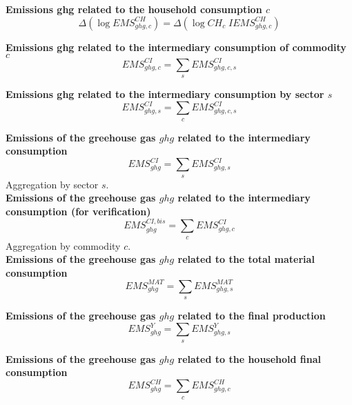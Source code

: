 \documentclass[12pt]{article}
\numberwithin{equation}{section}
\begin{document}
\noindent \textbf{Emissions ghg related to the household consumption $c$} 
\begin{dmath}
\varDelta \left(\operatorname{log} EMS^{CH}_{ghg, c}\right) = \varDelta \left(\operatorname{log} CH_{c} \; IEMS^{CH}_{ghg, c}\right)
\label{ghg_emissions.mdlEMS_CH[ghg,c]}
\end{dmath}

\noindent \textbf{Emissions ghg related to the intermediary consumption of commodity $c$} 
\begin{dmath}
EMS^{CI}_{ghg, c} = \sum_{s} EMS^{CI}_{ghg, c, s}
\label{ghg_emissions.mdlEMS_CI[ghg,c]}
\end{dmath}

\noindent \textbf{Emissions ghg related to the intermediary consumption by sector $s$} 
\begin{dmath}
EMS^{CI}_{ghg, s} = \sum_{c} EMS^{CI}_{ghg, c, s}
\label{ghg_emissions.mdlEMS_CI[ghg,s]}
\end{dmath}

\noindent \textbf{Emissions of the greehouse gas $ghg$ related to the intermediary consumption} 
\begin{dmath}
EMS^{CI}_{ghg} = \sum_{s} EMS^{CI}_{ghg, s}
\label{ghg_emissions.mdlEMS_CI[ghg]}
\end{dmath}
Aggregation by sector $s$. \\

\noindent \textbf{Emissions of the greehouse gas $ghg$ related to the intermediary consumption (for verification)} 
\begin{dmath}
EMS^{CI,bis}_{ghg} = \sum_{c} EMS^{CI}_{ghg, c}
\label{ghg_emissions.mdlEMS_CIbis[ghg]}
\end{dmath}
Aggregation by commodity $c$. \\

\noindent \textbf{Emissions of the greehouse gas $ghg$ related to the total material consumption} 
\begin{dmath}
EMS^{MAT}_{ghg} = \sum_{s} EMS^{MAT}_{ghg, s}
\label{ghg_emissions.mdlEMS_MAT[ghg]}
\end{dmath}

\noindent \textbf{Emissions of the greehouse gas $ghg$ related to the final production} 
\begin{dmath}
EMS^{Y}_{ghg} = \sum_{s} EMS^{Y}_{ghg, s}
\label{ghg_emissions.mdlEMS_Y[ghg]}
\end{dmath}

\noindent \textbf{Emissions of the greehouse gas $ghg$ related to the household final consumption} 
\begin{dmath}
EMS^{CH}_{ghg} = \sum_{c} EMS^{CH}_{ghg, c}
\label{ghg_emissions.mdlEMS_CH[ghg]}
\end{dmath}
\end{document}

